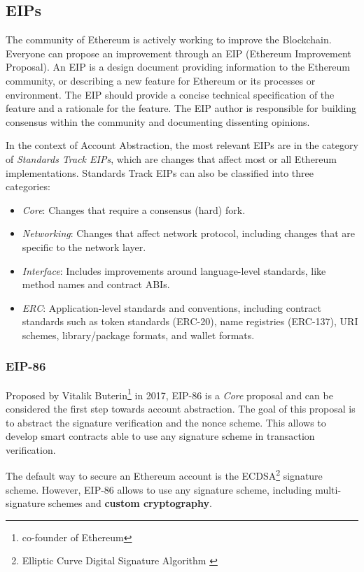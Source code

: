 \subsection{EIPs}
\label{subsec:eips}

The community of Ethereum is actively working to improve the Blockchain. Everyone can propose an improvement through an EIP (Ethereum Improvement Proposal). An EIP is a design document providing information to the Ethereum community, or describing a new feature for Ethereum or its processes or environment. The EIP should provide a concise technical specification of the feature and a rationale for the feature. The EIP author is responsible for building consensus within the community and documenting dissenting opinions. \cite{eip-1}

In the context of Account Abstraction, the most relevant EIPs are in the category of \textit{Standards Track EIPs}, which are changes that affect most or all Ethereum implementations. Standards Track EIPs can also be classified into three categories: \cite{eip-1}
\begin{itemize}
    \item \textit{Core}: Changes that require a consensus (hard) fork.
    \item \textit{Networking}: Changes that affect network protocol, including changes that are specific to the network layer.
    \item \textit{Interface}: Includes improvements around language-level standards, like method names and contract ABIs.
    \item \textit{ERC}: Application-level standards and conventions, including contract standards such as token standards (ERC-20), name registries (ERC-137), URI schemes, library/package formats, and wallet formats.
\end{itemize}

\subsubsection{EIP-86}
\label{subsubsec:eip-86}

Proposed by Vitalik Buterin\footnote{co-founder of Ethereum} in 2017, EIP-86 is a \textit{Core} proposal and can be considered the first step towards account abstraction. The goal of this proposal is to abstract the signature verification and the nonce scheme. This allows to develop smart contracts able to use any signature scheme in transaction verification. \cite{eip-86}

The default way to secure an Ethereum account is the ECDSA\footnote{Elliptic Curve Digital Signature Algorithm \cite{ECDSA}} signature scheme. However, EIP-86 allows to use any signature scheme, including multi-signature schemes and \textbf{custom cryptography}. \cite{eip-86}


